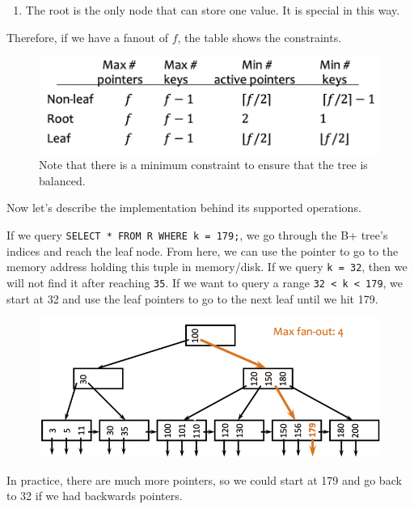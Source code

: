 \begin{definition}[B+ Tree]
\begin{enumerate}
        \item The root is the only node that can store one value. It is special in this way. 
      \end{enumerate}
    \end{definition}

    Therefore, if we have a fanout of $f$, the table shows the constraints. 

    \begin{figure}[H]
      \centering 
      \includegraphics[scale=0.3]{img/chart.png}
      \caption{Note that there is a minimum constraint to ensure that the tree is balanced. } 
      \label{fig:chart}
    \end{figure}

    Now let's describe the implementation behind its supported operations. 

    \begin{algo}[Lookup]
      If we query \texttt{SELECT * FROM R WHERE k = 179;}, we go through the B+ tree's indices and reach the leaf node. From here, we can use the pointer to go to the memory address holding this tuple in memory/disk. If we query \texttt{k = 32}, then we will not find it after reaching \texttt{35}. If we want to query a range \texttt{32 < k < 179}, we start at 32 and use the leaf pointers to go to the next leaf until we hit 179.  

      \begin{figure}[H]
        \centering 
        \includegraphics[scale=0.4]{img/fanout_ex.png}
        \caption{} 
        \label{fig:fanout_ex}
      \end{figure}

      In practice, there are much more pointers, so we could start at 179 and go back to 32 if we had backwards pointers. 
    \end{algo}

